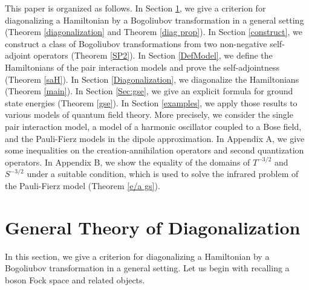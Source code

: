 \documentclass[12pt]{article}
\theoremstyle{plain}
\numberwithin{equation}{section}
\theoremstyle{remark}
\begin{document}

This paper is organized as follows.
In Section \ref{generalD}, we give a criterion for diagonalizing a Hamiltonian by a Bogoliubov 
transformation in a general setting (Theorem \ref{diagonalization} and Theorem \ref{diag prop}).
In Section \ref{construct}, we construct a class of Bogoliubov transformations from two non-negative self-adjoint operators (Theorem \ref{SP2}).
In Section \ref{DefModel}, we define the Hamiltonians of the pair interaction models and prove the self-adjointness (Theorem \ref{saH}).
In Section \ref{Diagonalization}, we diagonalize the Hamiltonians (Theorem \ref{main}). %
In Section \ref{Sec:gse}, we give an explicit formula for ground state energies (Theorem \ref{gse}).
In Section \ref{examples}, we apply those results to various models of quantum field theory. 
More precisely, we consider the single pair interaction model, a model of a harmonic oscillator coupled to a Bose field, and the Pauli-Fierz models in the dipole approximation. 
In Appendix A, we give some inequalities on the creation-annihilation operators and second quantization operators.
In Appendix B, we show the equality of the domains of $T^{-3/2}$ and $S^{-3/2}$ under a suitable condition, 
which is used to solve the infrared problem of the Pauli-Fierz model (Theorem \ref{e/a gs}).


\section{General Theory of Diagonalization}\label{generalD}

In this section, we give a criterion for diagonalizing a Hamiltonian by a Bogoliubov 
transformation in a general setting.
Let us begin with recalling a boson Fock space and related objects.
\end{document}
